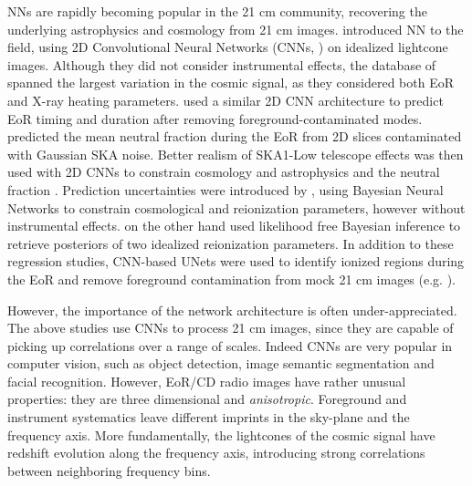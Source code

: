 \documentclass[fleqn,usenatbib]{mnras}
\begin{document}
 NNs are rapidly becoming popular in the 21 cm community, recovering the underlying astrophysics and cosmology from 21 cm images.  \citet{gillet19} introduced NN to the field, using 2D Convolutional Neural Networks (CNNs, \citealt{lecun1989backpropagation}) on idealized lightcone images.  Although they did not consider instrumental effects, the database of \citet{gillet19} spanned the largest variation in the cosmic signal, as they considered both EoR and X-ray heating parameters.
%
\citealt{21cm_ML_LaPlante19} used a similar 2D CNN architecture to predict EoR timing and duration after removing foreground-contaminated modes. \citealt{21cm_ML_Kwon20} predicted the mean neutral fraction during the EoR from 2D slices contaminated with Gaussian SKA noise. Better realism of SKA1-Low telescope effects was then used with 2D CNNs to constrain cosmology and astrophysics \citep{hassan2020} and the neutral fraction \citep{21cm_ML_Magena20}. Prediction uncertainties were introduced by \citealt{HMV20}, using Bayesian Neural Networks to constrain cosmological and reionization parameters, however without instrumental effects. \citealt{zhao2021} on the other hand used likelihood free Bayesian inference to retrieve posteriors of two idealized reionization parameters. 
In addition to these regression studies, CNN-based UNets were used to identify ionized regions during the EoR and remove foreground contamination from mock 21 cm images (e.g. \citealt{21cm_ML_Makinen20, bianco2021, Gargon-Hartman21}).

However, the importance of the network architecture is often under-appreciated. The above studies use CNNs to process 21 cm images, since they are capable of picking up correlations over a range of scales.  Indeed CNNs are very popular in computer vision, such as object detection, image semantic segmentation and facial recognition.  However, EoR/CD radio images have rather unusual properties: they are three dimensional and {\it anisotropic}.  Foreground and instrument systematics leave different imprints in the sky-plane and the frequency axis.  More fundamentally, the lightcones of the cosmic signal have redshift evolution along the frequency axis, introducing strong correlations between neighboring frequency bins.
\end{document}
